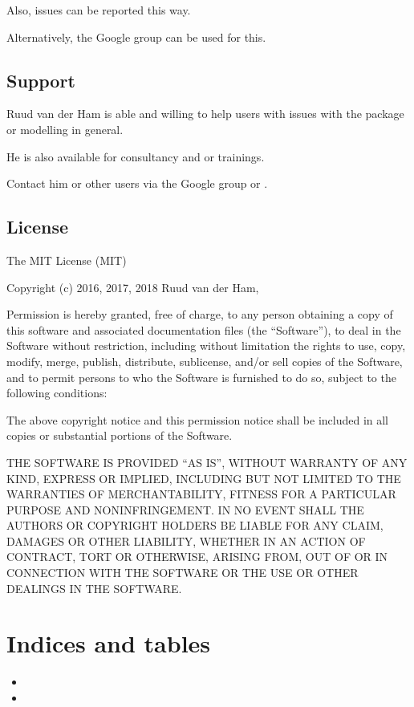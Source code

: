 \documentclass[letterpaper,10pt,english]{sphinxmanual}
\begin{document}
Also, issues can be reported this way.

Alternatively, the Google group can be used for this.


\section{Support}
\label{\detokenize{About:support}}
Ruud van der Ham is able and willing to help users with issues with the package or modelling in general.

He is also available for consultancy and or trainings.

Contact him or other users via the Google group or .


\section{License}
\label{\detokenize{About:license}}
The MIT License (MIT)

Copyright (c) 2016, 2017, 2018 Ruud van der Ham, 

Permission is hereby granted, free of charge, to any person obtaining a copy of
this software and associated documentation files (the “Software”), to deal in
the Software without restriction, including without limitation the rights to
use, copy, modify, merge, publish, distribute, sublicense, and/or sell copies
of the Software, and to permit persons to who the Software is furnished to do
so, subject to the following conditions:

The above copyright notice and this permission notice shall be included in all
copies or substantial portions of the Software.

THE SOFTWARE IS PROVIDED “AS IS”, WITHOUT WARRANTY OF ANY KIND, EXPRESS OR
IMPLIED, INCLUDING BUT NOT LIMITED TO THE WARRANTIES OF MERCHANTABILITY,
FITNESS FOR A PARTICULAR PURPOSE AND NONINFRINGEMENT. IN NO EVENT SHALL THE
AUTHORS OR COPYRIGHT HOLDERS BE LIABLE FOR ANY CLAIM, DAMAGES OR OTHER
LIABILITY, WHETHER IN AN ACTION OF CONTRACT, TORT OR OTHERWISE, ARISING FROM,
OUT OF OR IN CONNECTION WITH THE SOFTWARE OR THE USE OR OTHER DEALINGS IN THE
SOFTWARE.


\chapter{Indices and tables}
\label{\detokenize{Indices:indices-and-tables}}\label{\detokenize{Indices::doc}}\begin{itemize}
\item {} 

\item {} 

\end{itemize}



\renewcommand{\indexname}{Index}
\printindex
\end{document}

